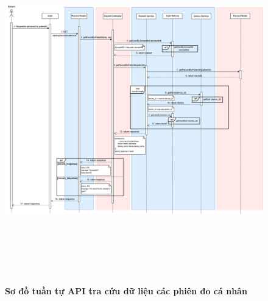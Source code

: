 \begin{figure}[H]
	\centering
	\includegraphics[width=15cm,height=15cm]{Images/api_sequence/record/getRecordByPatientId.drawio.png}
	\caption[Sơ đồ tuần tự API tra cứu danh sách dữ liệu các phiên đo cá nhân]{\bfseries \fontsize{12pt}{0pt}\selectfont Sơ đồ tuần tự API tra cứu dữ liệu các phiên đo cá nhân}
	\label{sequence_diagram_get_record_by_patient_id}
\end{figure}

